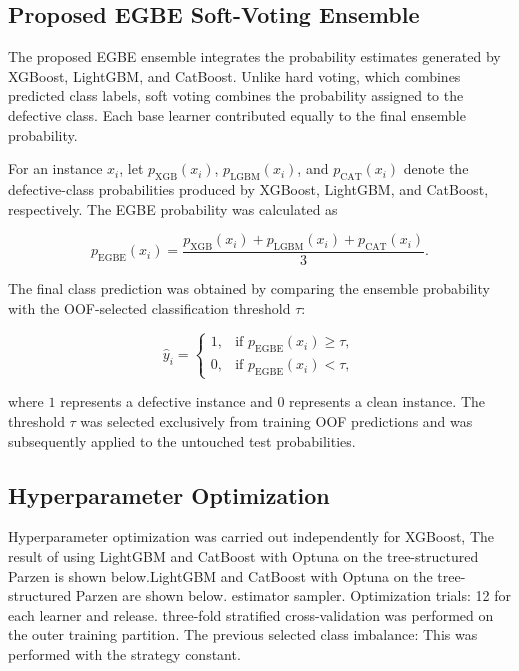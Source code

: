 \documentclass[conference]{IEEEtran}
\begin{document}
\subsection{Proposed EGBE Soft-Voting Ensemble}
\label{subsec:egbe-ensemble}

The proposed EGBE ensemble integrates the probability estimates
generated by XGBoost, LightGBM, and CatBoost. Unlike hard voting, which
combines predicted class labels, soft voting combines the probability
assigned to the defective class. Each base learner contributed equally
to the final ensemble probability.

For an instance \(x_i\), let
\(p_{\mathrm{XGB}}(x_i)\), \(p_{\mathrm{LGBM}}(x_i)\), and
\(p_{\mathrm{CAT}}(x_i)\) denote the defective-class probabilities
produced by XGBoost, LightGBM, and CatBoost, respectively. The EGBE
probability was calculated as

\begin{equation}
p_{\mathrm{EGBE}}(x_i)
=
\frac{
p_{\mathrm{XGB}}(x_i)
+
p_{\mathrm{LGBM}}(x_i)
+
p_{\mathrm{CAT}}(x_i)
}{3}.
\end{equation}

The final class prediction was obtained by comparing the ensemble
probability with the OOF-selected classification threshold \(\tau\):

\begin{equation}
\widehat{y}_i =
\begin{cases}
1, & \text{if } p_{\mathrm{EGBE}}(x_i) \geq \tau,\\
0, & \text{if } p_{\mathrm{EGBE}}(x_i) < \tau,
\end{cases}
\end{equation}

where \(1\) represents a defective instance and \(0\) represents a clean
instance. The threshold \(\tau\) was selected exclusively from training
OOF predictions and was subsequently applied to the untouched test
probabilities.

\subsection{Hyperparameter Optimization}
\label{subsec:hyperparameter-optimization}

Hyperparameter optimization was carried out independently for XGBoost,
The result of using LightGBM and CatBoost with Optuna on the tree-structured Parzen is shown below.LightGBM and CatBoost with Optuna on the tree-structured Parzen are shown below.
estimator sampler. Optimization trials: 12 for each learner and release.
three-fold stratified cross-validation was performed on the
outer training partition. The previous selected class imbalance:
This was performed with the strategy constant.
\end{document}
